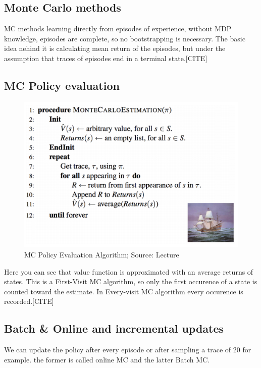 \subsection{Monte Carlo methods}

MC methods learning directly from episodes of experience,
without MDP knowledge, episodes are complete, so no bootstrapping is necessary. The basic idea nehind it is calculating mean return of the episodes, but under the assumption that traces of episodes end in a terminal state.[CITE]

\subsection{MC Policy evaluation}

\begin{figure}[h!]
  \centering
  \includegraphics[scale=0.5]{figures/mc_policy_evaluation.PNG}
  \caption{MC Policy Evaluation Algorithm; Source: Lecture}
  \label{fig:via}
\end{figure}

Here you can see that value function is approximated with an average returns of states. This is a First-Visit MC algorithm, so only the first occurence of a state is counted toward the estimate. In Every-visit MC algorithm every occurence is recorded.[CITE]



\subsection{Batch \& Online and incremental updates}
We can update the policy after every episode or after
sampling a trace of 20 for example. the former is called online MC and the latter Batch MC. \\

